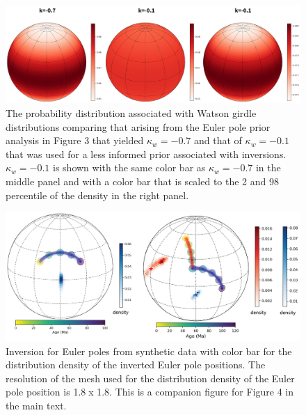 \documentclass[11pt,letterpaper]{article}
\begin{document}
\begin{figure}[h!]
\noindent\includegraphics[width=\textwidth]{SI_fig_Euler_prior.pdf}
\caption{The probability distribution associated with Watson girdle distributions comparing that arising from the Euler pole prior analysis in Figure 3 that yielded $\kappa_w=-0.7$ and that of $\kappa_w=-0.1$ that was used for a less informed prior associated with inversions.  $\kappa_w=-0.1$ is shown with the same color bar as $\kappa_w=-0.7$ in the middle panel and with a color bar that is scaled to the 2 and 98 percentile of the density in the right panel.}
\label{pdffiguresample}
\end{figure}



\begin{figure}[h!]
\noindent\includegraphics[width=\textwidth]{SI_synthetic_pep.png}
\caption{Inversion for Euler poles from synthetic data with color bar for the distribution density of the inverted Euler pole positions. The resolution of the mesh used for the distribution density of the Euler pole position is 1.8\textdegree$\;$x 1.8\textdegree. This is a companion figure for Figure 4 in the main text. }
\label{pdffiguresample}
\end{figure}
\end{document}
